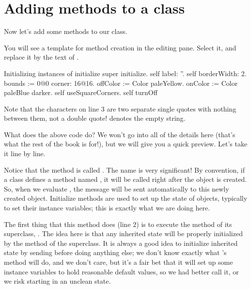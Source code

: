 \documentclass[a4paper,10pt,twoside]{book}
\begin{document}
\section{Adding methods to a class}

Now let's add some methods to our class.

You will see a template for method creation in the editing pane.
Select it, and replace it by the text of .

\begin{numMethod}[scbecellinitialize]{Initializing instances of }
initialize
   super initialize.
   self label: ''.
   self borderWidth: 2.
   bounds := 0@0 corner: 16@16.
   offColor := Color paleYellow.
   onColor := Color paleBlue darker.
   self useSquareCorners.
   self turnOff
\end{numMethod}

\noindent
Note that the characters  on line 3 are two separate single quotes with nothing between them, not a double quote!   denotes the empty string.


What does the above code do?  We won't go into all of the details here (that's what the rest of the book is for!), but we will give you a quick preview.  Let's take it line by line.

Notice that the method is called .
The name is very significant!
By convention, if a class defines a method named , it will be called right after the object is created.
So, when we evaluate , the message  will be sent automatically to this newly created object.
Initialize methods are used to set up the state of objects, typically to set their instance variables; this is exactly what we are doing here.

The first thing that this method does (line 2) is to execute the  method of its superclass, .
The idea here is that any inherited state will be properly initialized by the  method of the superclass.
It is always a good idea to initialize inherited state by sending  before doing anything else; we don't know exactly what 's  method will do, and we don't care, but it's a fair bet that it will set up some instance variables to hold reasonable default values, so we had better call it, or we risk starting in an unclean state.
\end{document}
